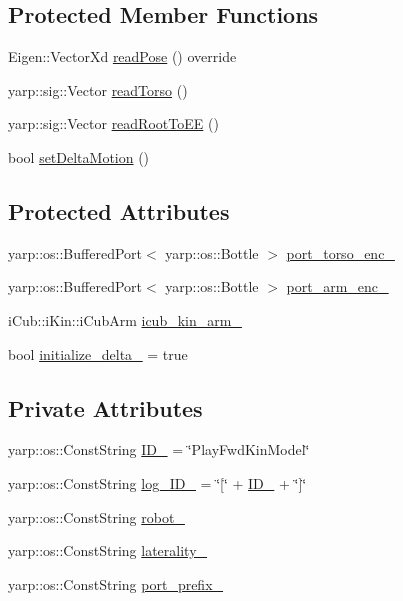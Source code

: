 \subsection*{Protected Member Functions}
\begin{DoxyCompactItemize}
\item 
Eigen\+::\+Vector\+Xd \hyperlink{classPlayFwdKinModel_a282700bc69b26e6ea28cc5048881a599}{read\+Pose} () override
\item 
yarp\+::sig\+::\+Vector \hyperlink{classPlayFwdKinModel_a04170578030a5db53f7af45876b11492}{read\+Torso} ()
\item 
yarp\+::sig\+::\+Vector \hyperlink{classPlayFwdKinModel_a97e565b16712bb26a41fc78c4d1fca89}{read\+Root\+To\+EE} ()
\item 
bool \hyperlink{classFwdKinModel_a12b54bd62ba5cf218973c600c66ba39e}{set\+Delta\+Motion} ()
\end{DoxyCompactItemize}
\subsection*{Protected Attributes}
\begin{DoxyCompactItemize}
\item 
yarp\+::os\+::\+Buffered\+Port$<$ yarp\+::os\+::\+Bottle $>$ \hyperlink{classPlayFwdKinModel_a092cea2f9523b8f303fded1067e2f965}{port\+\_\+torso\+\_\+enc\+\_\+}
\item 
yarp\+::os\+::\+Buffered\+Port$<$ yarp\+::os\+::\+Bottle $>$ \hyperlink{classPlayFwdKinModel_abe0b6fcb827b0c1c0b07ad083eb224e6}{port\+\_\+arm\+\_\+enc\+\_\+}
\item 
i\+Cub\+::i\+Kin\+::i\+Cub\+Arm \hyperlink{classPlayFwdKinModel_af6e5c3ce282a1326b7d58e45c68412a9}{icub\+\_\+kin\+\_\+arm\+\_\+}
\item 
bool \hyperlink{classFwdKinModel_a2ed7b77ebd710e5debe63b83a34a1645}{initialize\+\_\+delta\+\_\+} = true
\end{DoxyCompactItemize}
\subsection*{Private Attributes}
\begin{DoxyCompactItemize}
\item 
yarp\+::os\+::\+Const\+String \hyperlink{classPlayFwdKinModel_a2e37370f9958d7b77bc1377ede99d554}{I\+D\+\_\+} = \char`\"{}Play\+Fwd\+Kin\+Model\char`\"{}
\item 
yarp\+::os\+::\+Const\+String \hyperlink{classPlayFwdKinModel_a8e6132483f92deaed9ad1c529d398673}{log\+\_\+\+I\+D\+\_\+} = \char`\"{}\mbox{[}\char`\"{} + \hyperlink{classPlayFwdKinModel_a2e37370f9958d7b77bc1377ede99d554}{I\+D\+\_\+} + \char`\"{}\mbox{]}\char`\"{}
\item 
yarp\+::os\+::\+Const\+String \hyperlink{classPlayFwdKinModel_acb83b9edcd4d111ff6f295f26796351d}{robot\+\_\+}
\item 
yarp\+::os\+::\+Const\+String \hyperlink{classPlayFwdKinModel_a9066d4c54a62b989be77ab29a0b65f93}{laterality\+\_\+}
\item 
yarp\+::os\+::\+Const\+String \hyperlink{classPlayFwdKinModel_adcde73c93a3e42a6b444db742d9d50af}{port\+\_\+prefix\+\_\+}
\end{DoxyCompactItemize}


